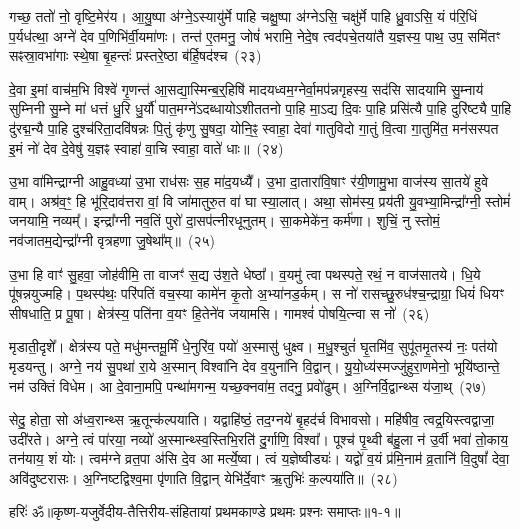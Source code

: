 गच्छ॒ ततो॑ नो॒ वृष्टि॒मेर॑य। आ॒यु॒ष्पा अ॑ग्ने॒\-ऽस्यायु॑र्मे पाहि चक्षु॒ष्पा अ॑ग्ने\-ऽसि॒ चक्षु॑र्मे पाहि ध्रु॒वा\-ऽसि॒ यं प॑रि॒धिं प॒र्यध॑त्था॒ अग्ने॑ देव प॒णिभि॑र्वी॒यमा॑णः। तन्त॑ ए॒तमनु॒ जोषं॑ भरामि॒ नेदे॒ष त्वद॑पचे॒तया॑तै य॒ज्ञस्य॒ पाथ॒ उप॒ समि॑तꣳ सꣴस्रा॒वभा॑गाः स्थे॒षा बृ॒हन्तः॑ प्रस्तरे॒ष्ठा ब॑र्\mbox{}हि॒षद॑श्च~(२३)\ip

दे॒वा इ॒मां वाच॑म॒भि विश्वे॑ गृ॒णन्त॑ आ॒सद्या॒स्मिन्ब॒र्॒हिषि॑ मादयध्वम॒ग्नेर्वा॒मप॑न्नगृहस्य॒ सद॑सि सादयामि सु॒म्नाय॑ सुम्निनी सु॒म्ने मा॑ धत्तं धु॒रि धु॒र्यौ॑ पात॒मग्ने॑\-ऽदब्धायो\-ऽशीततनो पा॒हि मा॒\-ऽद्य दि॒वः पा॒हि प्रसि॑त्यै पा॒हि दुरि॑ष्ट्यै पा॒हि दु॑रद्म॒न्यै पा॒हि दुश्च॑रिता॒दवि॑षन्नः पि॒तुं कृ॑णु सु॒षदा॒ योनि॒ꣴ॒ स्वाहा॒ देवा॑ गातुविदो गा॒तुं वि॒त्वा गा॒तुमि॑त॒ मन॑सस्पत इ॒मं नो॑ देव दे॒वेषु॑ य॒ज्ञꣴ स्वाहा॑ वा॒चि स्वाहा॒ वाते॑ धाः॥~(२४)\ip

{\anuvakamend[{दिव॑ञ्च वि॒त्वा गा॒तुन्त्रयो॑दश च}]}

उ॒भा वा॑मिन्द्राग्नी आहु॒वध्या॑ उ॒भा राध॑सः स॒ह मा॑द॒यध्यै᳚। उ॒भा दा॒तारा॑वि॒षाꣳ र॑यी॒णामु॒भा वाज॑स्य सा॒तये॑ हुवे वाम्। अश्र॑व॒ꣳ॒ हि भू॑रि॒दाव॑त्तरा वां॒ वि जा॑मातुरु॒त वा॑ घा स्या॒लात्। अथा॒ सोम॑स्य॒ प्रय॑ती यु॒वभ्या॒मिन्द्रा᳚ग्नी॒ स्तोमं॑ जनयामि॒ नव्यम्᳚। इन्द्रा᳚ग्नी नव॒तिं पुरो॑ दा॒सप॑त्नीरधूनुतम्। सा॒कमेके॑न॒ कर्म॑णा। शुचिं॒ नु स्तोमं॒ नव॑जातम॒द्येन्द्रा᳚ग्नी वृत्रहणा जु॒षेथा᳚म्॥~(२५)\ip

उ॒भा हि वाꣳ॑ सु॒हवा॒ जोह॑वीमि॒ ता वाजꣳ॑ स॒द्य उ॑श॒ते धेष्ठा᳚। व॒यमु॑ त्वा पथस्पते॒ रथं॒ न वाज॑सातये। धि॒ये पू॑षन्नयुज्महि। प॒थस्प॑थः॒ परि॑पतिं वच॒स्या कामे॑न कृ॒तो अ॒भ्या॑नड॒र्कम्। स नो॑ रासच्छु॒रुध॑श्च॒न्द्राग्रा॒ धियं॑ धियꣳ सीषधाति॒ प्र पू॒षा। क्षेत्र॑स्य॒ पति॑ना व॒यꣳ हि॒तेने॑व जयामसि। गामश्वं॑ पोषयि॒त्न्वा स नो॑~(२६)\ip

मृडाती॒दृशे᳚। क्षेत्र॑स्य पते॒ मधु॑मन्तमू॒र्मिं धे॒नुरि॑व॒ पयो॑ अ॒स्मासु॑ धुक्ष्व। म॒धु॒श्चुतं॑ घृ॒तमि॑व॒ सुपू॑तमृ॒तस्य॑ नः॒ पत॑यो मृडयन्तु। अग्ने॒ नय॑ सु॒पथा॑ रा॒ये अ॒स्मान् विश्वा॑नि देव व॒युना॑नि वि॒द्वान्। यु॒यो॒ध्य॑स्मज्जु॑हुरा॒णमेनो॒ भूयि॑ष्ठान्ते॒ नम॑ उक्तिं विधेम। आ दे॒वाना॒मपि॒ पन्था॑मगन्म॒ यच्छ॒क्नवा॑म॒ तदनु॒ प्रवो॑ढुम्। अ॒ग्निर्वि॒द्वान्थ्स य॑जा॒थ्~(२७)\ip

सेदु॒ होता॒ सो अ॑ध्व॒रान्थ्स ऋ॒तून्क॑ल्पयाति। यद्वा\-हि॑ष्ठं॒ तद॒ग्नये॑ बृ॒हद॑र्च विभावसो। महि॑षीव॒ त्वद्र॒यिस्त्वद्वाजा॒ उदी॑रते। अग्ने॒ त्वं पा॑रया॒ नव्यो॑ अ॒स्मान्थ्स्व॒स्तिभि॒रति॑ दु॒र्गाणि॒ विश्वा᳚। पूश्च॑ पृ॒थ्वी ब॑हु॒ला न॑ उ॒र्वी भवा॑ तो॒काय॒ तन॑याय॒ शं योः। त्वम॑ग्ने व्रत॒पा अ॑सि दे॒व आ मर्त्ये॒ष्वा। त्वं य॒ज्ञेष्वीड्यः॑। यद्वो॑ व॒यं प्र॑मि॒नाम॑ व्र॒तानि॑ वि॒दुषां᳚ देवा॒ अवि॑दुष्टरासः। अ॒ग्निष्टद्विश्व॒मा पृ॑णाति वि॒द्वान् येभि॑र्दे॒वाꣳ ऋ॒तुभिः॑ क॒ल्पया॑ति॥~(२८)\ip

{\anuvakamend[{जु॒षेथा॒मा स नो॑ यजा॒दा त्रयो॑विꣳशतिश्च}]}

{हरिः॑ ॐ}{॥कृष्ण-यजुर्वेदीय-तैत्तिरीय-संहितायां प्रथमकाण्डे प्रथमः प्रश्नः समाप्तः॥१-१॥}



